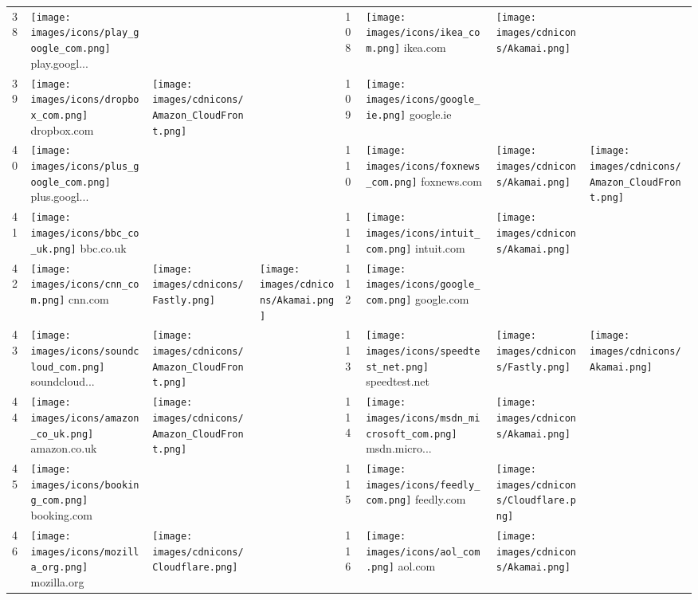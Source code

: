 \begin{table}[tbp]
\begin{tabular}{|llll|llll|}
38 & \texttt{[image: images/icons/play\_google\_com.png]} play.googl... & & & 108 & \texttt{[image: images/icons/ikea\_com.png]} ikea.com & \texttt{[image: images/cdnicons/Akamai.png]} & \\
39 & \texttt{[image: images/icons/dropbox\_com.png]} dropbox.com & \texttt{[image: images/cdnicons/Amazon\_CloudFront.png]} & & 109 & \texttt{[image: images/icons/google\_ie.png]} google.ie & & \\
40 & \texttt{[image: images/icons/plus\_google\_com.png]} plus.googl... & & & 110 & \texttt{[image: images/icons/foxnews\_com.png]} foxnews.com & \texttt{[image: images/cdnicons/Akamai.png]} & \texttt{[image: images/cdnicons/Amazon\_CloudFront.png]} \\
41 & \texttt{[image: images/icons/bbc\_co\_uk.png]} bbc.co.uk & & & 111 & \texttt{[image: images/icons/intuit\_com.png]} intuit.com & \texttt{[image: images/cdnicons/Akamai.png]} & \\
42 & \texttt{[image: images/icons/cnn\_com.png]} cnn.com & \texttt{[image: images/cdnicons/Fastly.png]} & \texttt{[image: images/cdnicons/Akamai.png]} & 112 & \texttt{[image: images/icons/google\_com.png]} google.com & & \\
43 & \texttt{[image: images/icons/soundcloud\_com.png]} soundcloud... & \texttt{[image: images/cdnicons/Amazon\_CloudFront.png]} & & 113 & \texttt{[image: images/icons/speedtest\_net.png]} speedtest.net & \texttt{[image: images/cdnicons/Fastly.png]} & \texttt{[image: images/cdnicons/Akamai.png]} \\
44 & \texttt{[image: images/icons/amazon\_co\_uk.png]} amazon.co.uk & \texttt{[image: images/cdnicons/Amazon\_CloudFront.png]} & & 114 & \texttt{[image: images/icons/msdn\_microsoft\_com.png]} msdn.micro... & \texttt{[image: images/cdnicons/Akamai.png]} & \\
45 & \texttt{[image: images/icons/booking\_com.png]} booking.com & & & 115 & \texttt{[image: images/icons/feedly\_com.png]} feedly.com & \texttt{[image: images/cdnicons/Cloudflare.png]} & \\
46 & \texttt{[image: images/icons/mozilla\_org.png]} mozilla.org & \texttt{[image: images/cdnicons/Cloudflare.png]} & & 116 & \texttt{[image: images/icons/aol\_com.png]} aol.com & \texttt{[image: images/cdnicons/Akamai.png]} & \\

\end{tabular}
\end{table}
